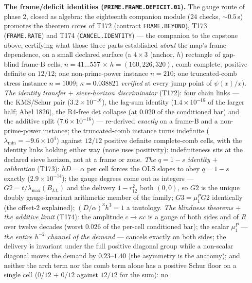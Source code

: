 \par\smallskip\noindent\textbf{The frame/deficit identities
(\texttt{PRIME.FRAME.DEFICIT.01}).}
The gauge route of phase 2, closed as algebra: the eighteenth companion
module ($24$ checks, ${\sim}0.5$\,s) promotes the theorem cores of
T172 (contract \texttt{FRAME.BEYOND}), T173 (\texttt{FRAME.RATE}) and
T174 (\texttt{CANCEL.IDENTITY}) --- the companion to the capstone
above, certifying what those three parts established \emph{about} the
map's frame dependence, on a small declared surface (a $4\times3$
(anchor, $h$) rectangle of gap-blind frame-B cells, $n=41\ldots557$
$\times$ $h=(160,226,320)$, comb complete, positive definite on
$12/12$; one non-prime-power instance $n=210$; one truncated-comb
stress instance $n=1009$; $\kappa=0.038821$ \emph{verified} at every
jump point of $\psi(x)/x$).
\emph{The identity transfer $+$ sieve-horizon discriminator} (T172):
four chain links --- the KMS/Schur pair ($3.2\times10^{-16}$), the
lag-sum identity ($1.4\times10^{-16}$ of the larger half; Abel 1826),
the R4-free det collapse (at $0.020$ of the conditioned bar) and the
additive split ($7.6\times10^{-16}$) --- re-derived \emph{exactly} on a
frame-B and a non-prime-power instance; the truncated-comb instance
turns indefinite ($\lambda_{\min}=-9.6\times10^{4}$) against $12/12$
positive definite complete-comb cells, with the identity links holding
either way (none uses positivity): indefiniteness sits at the declared
sieve horizon, not at a frame or zone.
\emph{The $q=1-s$ identity $+$ calibration} (T173): $hD=\alpha$ per
cell forces the OLS slopes to obey $q=1-s$ exactly
($2.9\times10^{-14}$); the gauge degrees come out as integers ---
$G2=t/\lambda_{\max}(B_{LL})$ and the delivery $1-r_{12}^2$ both
$(0,0)$, so $G2$ is the unique doubly gauge-invariant arithmetic member
of the family; $G3=\mu^P_1G2$ identically (the offset-$2$ explained);
$(D/\alpha)^3h^3=1$ a tautology.
\emph{The blindness theorems $+$ the additive limit} (T174): the
amplitude $c\to\kappa c$ is a gauge of both sides and of $R$ over
twelve decades (worst $0.026$ of the per-cell conditioned bar); the
scalar $\mu^P_1$ --- \emph{the entire $h^{-2}$ channel of the demand}
--- cancels exactly on both sides; the delivery is invariant under the
full positive diagonal group while a non-scalar diagonal moves the
demand by $0.23$--$1.40$ (the asymmetry is the anatomy); and neither
the arch term nor the comb term alone has a positive Schur floor on a
single cell ($0/12$ $+$ $0/12$ against $12/12$ for the sum): no
